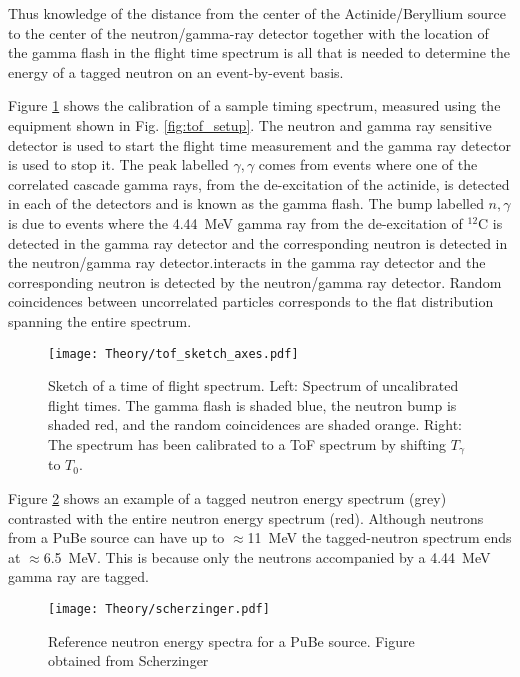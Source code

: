 \documentclass[main.tex]{subfiles}
\begin{document}
Thus knowledge of the distance from the center of the Actinide/Beryllium source to the center of the neutron/gamma-ray detector together with the location of the gamma flash in the flight time spectrum is all that is needed to determine the energy of a tagged neutron on an event-by-event basis.

Figure \ref{fig:tof_sketch} shows the calibration of a sample timing spectrum, measured using the equipment shown in Fig. \ref{fig:tof_setup}. The neutron and gamma ray sensitive detector is used to start the flight time measurement and the gamma ray detector is used to stop it. The peak labelled $\gamma,\gamma$ comes from events where one of the correlated cascade gamma rays, from the de-excitation of the actinide, is detected in each of the detectors and is known as the gamma flash. The bump labelled $n,\gamma$ is due to events where the \SI{4.44}{\MeV} gamma ray from the de-excitation of $^12$C is detected in the gamma ray detector and the corresponding neutron is detected in the neutron/gamma ray detector.interacts in the gamma ray detector and the corresponding neutron is detected by the neutron/gamma ray detector. Random coincidences between uncorrelated particles corresponds to the flat distribution spanning the entire spectrum.

\begin{figure}[t]
    \centering
        \texttt{[image: Theory/tof\_sketch\_axes.pdf]}
        \caption[Sketch of a time of flight spectrum.]{Sketch of a time of flight spectrum. Left: Spectrum of uncalibrated flight times. The gamma flash is shaded blue, the neutron bump is shaded red, and the random coincidences are shaded orange. Right: The spectrum has been calibrated to a ToF spectrum by shifting $T_\gamma$ to $T_0$.}
    \label{fig:tof_sketch} 
\end{figure}
Figure \ref{fig:scherzinger} shows an example of a tagged neutron energy spectrum (grey) contrasted with the entire neutron energy spectrum (red). Although neutrons from a PuBe source can have up to $\approx$\SI{11}{\MeV} the tagged-neutron spectrum ends at $\approx$\SI{6.5}{\MeV}. This is because only the neutrons accompanied by a \SI{4.44}{\MeV} gamma ray are tagged.
\begin{figure}[t]
    \centering
        \texttt{[image: Theory/scherzinger.pdf]}
        \caption[Reference neutron energy spectrum]{Reference neutron energy spectra for a PuBe source. Figure obtained from Scherzinger\cite{ScherzingerPhd}}
    \label{fig:scherzinger} 
\end{figure}
\end{document}
